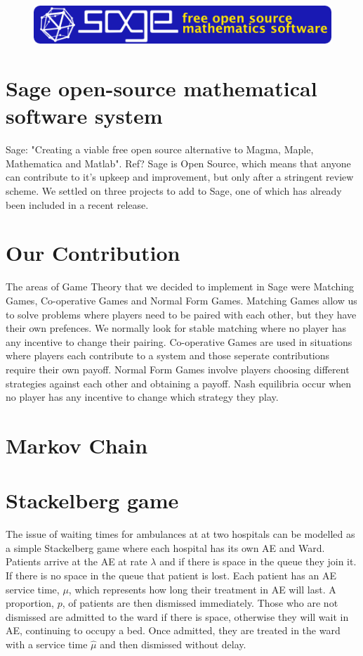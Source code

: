 \documentclass[a0,landscape]{a0poster}
\begin{document}
\vspace{1cm}
\begin{multicols}{3}


\begin{figure}[H]
\centering
\includegraphics[width=0.9\linewidth]{Images/sage-banner-02.png}
\end{figure}

\color{Brown}
\section*{Sage open-source mathematical software system}
Sage: "Creating a viable free open source alternative to Magma, Maple, Mathematica and Matlab".
Ref?
Sage is Open Source, which means that anyone can contribute to it's upkeep and improvement, but only after a stringent review scheme.
We settled on three projects to add to Sage, one of which has already been included in a recent release.

\section*{Our Contribution}
The areas of Game Theory that we decided to implement in Sage were Matching Games, Co-operative Games and Normal Form Games.
Matching Games allow us to solve problems where players need to be paired with each other, but they have their own prefences.
We normally look for stable matching where no player has any incentive to change their pairing.
Co-operative Games are used in situations where players each contribute to a system and those seperate contributions require their own payoff.
Normal Form Games involve players choosing different strategies against each other and obtaining a payoff.
Nash equilibria occur when no player has any incentive to change which strategy they play.


\color{Goldenrod}
\section*{Markov Chain}


\section*{Stackelberg game}
The issue of waiting times for ambulances at at two hospitals can be modelled as a simple Stackelberg game where each hospital has its own AE and Ward.
Patients arrive at the AE at rate $\lambda$ and if there is space in the queue they join it.
If there is no space in the queue that patient is lost.
Each patient has an AE service time, $\mu$, which represents how long their treatment in AE will last.
A proportion, $p$, of patients are then dismissed immediately.
Those who are not dismissed are admitted to the ward if there is space, otherwise they will wait in AE, continuing to occupy a bed.
Once admitted, they are treated in the ward with a service time $\hat{\mu}$ and then dismissed without delay.


\end{multicols}
\end{document}
